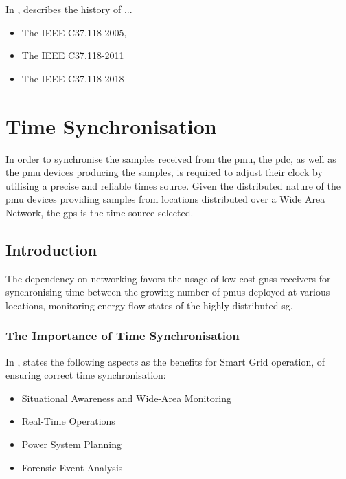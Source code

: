 In \cite{martin2013synchrophasor}, \citeauthor{martin2013synchrophasor}describes the history of ...

\begin{itemize}
    \item The IEEE C37.118-2005,
    \item The IEEE C37.118-2011
    \item The IEEE C37.118-2018
\end{itemize}







\section{Time Synchronisation}
In order to synchronise the samples received from the \acrshort{pmu}, the \acrshort{pdc}, as well as the \acrshort{pmu} devices producing the samples, is required to adjust their clock by utilising a precise and reliable times source.  Given the distributed nature of the \acrshort{pmu} devices providing samples from locations distributed over a Wide Area Network, the \acrfull{gps} is the  time source selected. 

\subsection{Introduction}


The dependency on networking favors the usage of low-cost \acrshort{gnss} receivers for synchronising time between the growing number of \acrshort{pmu}s deployed at various locations, monitoring energy flow states of the highly distributed \acrshort{sg}. 



\subsubsection{The Importance of Time Synchronisation}

In \cite{dagle2019importance}, \citeauthor{dagle2019importance} states the following aspects as the benefits for Smart Grid operation, of ensuring correct time synchronisation:


\begin{itemize}
    \item  Situational Awareness and Wide-Area Monitoring
    \item  Real-Time Operations
    \item  Power System Planning 
    \item  Forensic Event Analysis
    
\end{itemize}


